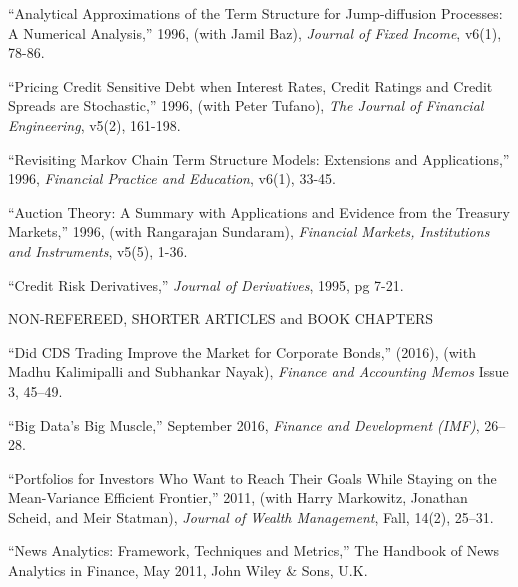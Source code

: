 \documentclass{article}
\begin{document}
\begin{etaremune}
\item
``Analytical Approximations of  the Term Structure
for Jump-diffusion Processes: A Numerical Analysis,'' 1996, 
(with Jamil Baz), {\it Journal of Fixed Income}, v6(1), 78-86.  

\item
``Pricing Credit Sensitive Debt when Interest Rates, Credit Ratings
and Credit Spreads are Stochastic,'' 1996, 
(with Peter Tufano), {\it The Journal of Financial Engineering},
v5(2), 161-198.

\item
``Revisiting Markov Chain Term Structure Models: Extensions and
Applications,'' 1996, {\it Financial Practice and Education}, v6(1), 33-45.  

\item
``Auction Theory: A Summary with Applications and Evidence
from the Treasury Markets,'' 1996, (with Rangarajan Sundaram),
{\it Financial Markets, Institutions and Instruments}, v5(5), 1-36.

\item
``Credit Risk Derivatives,'' {\it Journal of Derivatives}, 1995, pg 7-21. 



\begin{description}
\item[NON-REFEREED, SHORTER ARTICLES and BOOK CHAPTERS] \mbox{}
\end{description}


\item ``Did CDS Trading Improve the Market for Corporate Bonds,'' (2016), (with Madhu Kalimipalli and Subhankar Nayak), {\it Finance and Accounting Memos} Issue 3, 45--49. 

\item ``Big Data's Big Muscle,'' September 2016, {\it Finance and Development (IMF)}, 26--28. 

\item ``Portfolios for Investors Who Want to Reach Their Goals While Staying on the Mean-Variance Efficient Frontier,'' 2011, (with Harry Markowitz, Jonathan Scheid, and Meir Statman), {\it Journal of Wealth Management}, Fall, 14(2), 25--31.

\item ``News Analytics: Framework, Techniques and Metrics,'' The Handbook of News Analytics in Finance, May 2011, John Wiley \& Sons, U.K. 


\end{etaremune}
\end{document}
